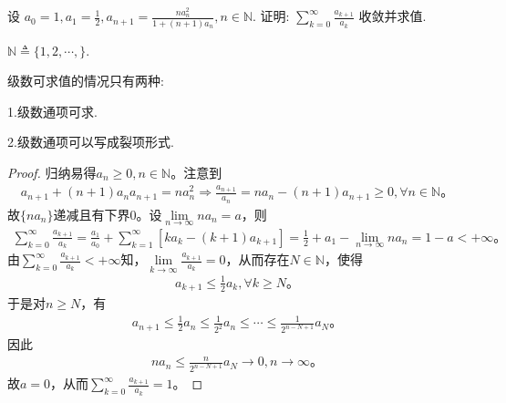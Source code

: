 \documentclass[../../main.tex]{subfiles}
\begin{document}
\begin{example}
设 \( a_0 = 1, a_1 = \frac{1}{2}, a_{n+1} = \frac{n a_n^2}{1 + (n + 1) a_n}, n \in \mathbb{N} \). 证明: \( \sum_{k=0}^{\infty} \frac{a_{k+1}}{a_k} \) 收敛并求值.
\end{example}
\begin{remark}
$\mathbb{N}\triangleq \{1,2,\cdots,\}$.
\end{remark}
\begin{remark}
级数可求值的情况只有两种:

1.级数通项可求.

2.级数通项可以写成裂项形式.
\end{remark}
\begin{proof}
归纳易得$a_n\geqslant 0,n\in \mathbb{N}$。注意到
\begin{align*}
a_{n+1}+\left( n+1 \right) a_na_{n+1}=na_{n}^{2}\Longrightarrow \frac{a_{n+1}}{a_n}=na_n-\left( n+1 \right) a_{n+1}\geqslant 0,\forall n\in \mathbb{N}。
\end{align*}
故$\{ na_n \}$递减且有下界$0$。设$\lim\limits_{n\rightarrow \infty}na_n=a$，则
\begin{align*}
\sum_{k=0}^{\infty}{\frac{a_{k+1}}{a_k}}=\frac{a_1}{a_0}+\sum_{k=1}^{\infty}{\left[ ka_k-\left( k+1 \right) a_{k+1} \right]}=\frac{1}{2}+a_1-\lim\limits_{n\rightarrow \infty}na_n=1-a<+\infty。
\end{align*}
由$\sum_{k=0}^{\infty}{\frac{a_{k+1}}{a_k}}<+\infty$知，$\lim\limits_{k\rightarrow \infty}\frac{a_{k+1}}{a_k}=0$，从而存在$N\in \mathbb{N}$，使得
\begin{align*}
a_{k+1}\leqslant \frac{1}{2}a_k,\forall k\geqslant N。
\end{align*}
于是对$n\geqslant N$，有
\begin{align*}
a_{n+1}\leqslant \frac{1}{2}a_n\leqslant \frac{1}{2^2}a_n\leqslant \cdots \leqslant \frac{1}{2^{n-N+1}}a_N。
\end{align*}
因此
\begin{align*}
na_n\leqslant \frac{n}{2^{n-N+1}}a_N\rightarrow 0,n\rightarrow \infty。
\end{align*}
故$a=0$，从而$\sum_{k=0}^{\infty}{\frac{a_{k+1}}{a_k}}=1$。

\end{proof}
\end{document}
